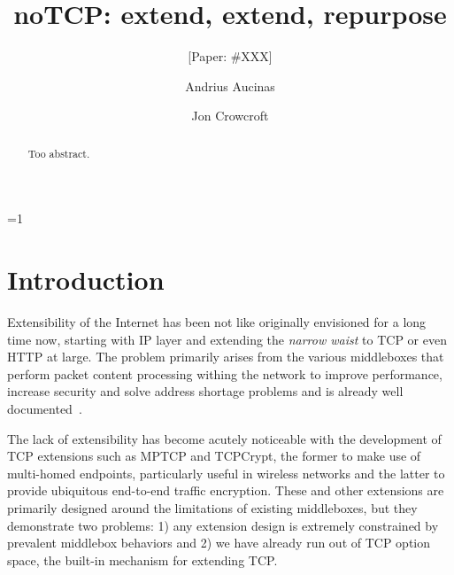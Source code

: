 \documentclass{sig-alternate-10pt}
\def\anon{1}        %
\begin{document}
\date{}


\title{noTCP: extend, extend, repurpose}
\ifnum\anon=1
\author{[Paper: \#XXX]}%
\else
{}
\author{
\alignauthor Andrius Aucinas\\
\and
\alignauthor Jon Crowcroft\\
}
\fi

    
\maketitle
\begin{abstract}
Too abstract.
\end{abstract} 

\section{Introduction}
\label{section:intro}

Extensibility of the Internet has been not like originally envisioned for a long time now, starting with IP layer and extending the \emph{narrow waist} to TCP or even HTTP at large. The problem primarily arises from the various middleboxes that perform packet content processing withing the network to improve performance\cite{Kopparty:2002ht,Chakravorty:2003dm}, increase security\cite{Handley:2001vp,Vutukuru:2008fc} and solve address shortage problems and is already well documented~\cite{UntoldMiddlebox2011,Qian:2012bj,Honda:2011ci,Guha:2005tb}.

The lack of extensibility has become acutely noticeable with the development of TCP extensions such as MPTCP and TCPCrypt, the former to make use of multi-homed endpoints, particularly useful in wireless networks and the latter to provide ubiquitous end-to-end traffic encryption. These and other extensions are primarily designed around the limitations of existing middleboxes, but they demonstrate two problems: 1) any extension design is extremely constrained by prevalent middlebox behaviors\cite{Honda:2011ci} and 2) we have already run out of TCP option space, the built-in mechanism for extending TCP.
\end{document}
